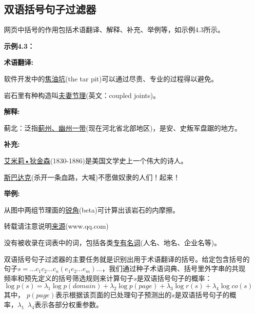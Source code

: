 \subsection{双语括号句子过滤器}

网页中括号的作用包括术语翻译、解释、补充、举例等，如示例4.3所示。

\begin{center}
	\begin{boxedminipage}[h]{0.9\linewidth}
		\small
		\textbf{示例4.3：}
		
		\textbf{术语翻译:}
		
		软件开发中的\underline{焦油坑}(the tar pit)可以通过尽责、专业的过程得以避免。
		
		岩石里有种构造叫\underline{夫妻节理}(英文：coupled joints)。
		
		\textbf{解释:}
		
		蓟北：泛指\underline{蓟州、幽州一带}(现在河北省北部地区)，是安、史叛军盘踞的地方。
		
		\textbf{补充:}
		
		\underline{艾米莉•狄金森}(1830-1886)是美国文学史上一个伟大的诗人。
		
		\underline{斯巴达克}(杀开一条血路，大喊)不愿做奴隶的人们！起来！
		
		\textbf{举例: }
		
		从图中两组节理面的\underline{锐角}(beta)可计算出该岩石的内摩擦。
		
		转载请注意说明\underline{来源}(www.qq.com) 
		
		没有被收录在词表中的词，包括各类\underline{专有名词}(人名、地名、企业名等)。
	\end{boxedminipage}
\end{center}

双语括号句子过滤器的主要任务就是识别出用于术语翻译的括号。给定包含括号的句子$s=\ldots c_1c_2\ldots c_n(e_1e_2\ldots e_m) \ldots $，我们通过种子术语词典、括号里外字串的共现频率和预先定义的括号筛选规则来计算句子$s$是双语括号句子的概率：
\begin{equation}\label{bilingual_sent}
\log p(s) = \lambda_1 \log p(domain) + \lambda_2 \log p(page) + \lambda_3 \log r(s) + \lambda_4 \log co(s)
\end{equation}
其中， $p(page)$表示根据该页面的已处理句子预测出的$s$是双语括号句子的概率，$\lambda_1$~$\lambda_4$表示各部分权重参数。

